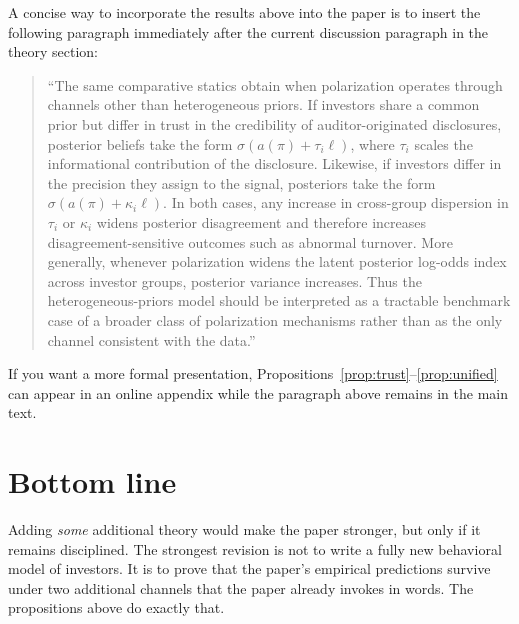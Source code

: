 \documentclass[12pt]{article}
\begin{document}
A concise way to incorporate the results above into the paper is to insert the following paragraph immediately after the current discussion paragraph in the theory section:

\begin{quote}
``The same comparative statics obtain when polarization operates through channels other than heterogeneous priors. If investors share a common prior but differ in trust in the credibility of auditor-originated disclosures, posterior beliefs take the form $\sigma(a(\pi)+\tau_i\ell)$, where $\tau_i$ scales the informational contribution of the disclosure. Likewise, if investors differ in the precision they assign to the signal, posteriors take the form $\sigma(a(\pi)+\kappa_i\ell)$. In both cases, any increase in cross-group dispersion in $\tau_i$ or $\kappa_i$ widens posterior disagreement and therefore increases disagreement-sensitive outcomes such as abnormal turnover. More generally, whenever polarization widens the latent posterior log-odds index across investor groups, posterior variance increases. Thus the heterogeneous-priors model should be interpreted as a tractable benchmark case of a broader class of polarization mechanisms rather than as the only channel consistent with the data.''
\end{quote}

If you want a more formal presentation, Propositions~\ref{prop:trust}--\ref{prop:unified} can appear in an online appendix while the paragraph above remains in the main text.

\section*{Bottom line}

Adding \emph{some} additional theory would make the paper stronger, but only if it remains disciplined. The strongest revision is not to write a fully new behavioral model of investors. It is to prove that the paper's empirical predictions survive under two additional channels that the paper already invokes in words. The propositions above do exactly that.
\end{document}
